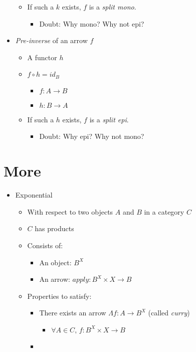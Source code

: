 \begin{itemize}
\begin{itemize}
\begin{itemize}
                \end{itemize}
          \item If such a $k$ exists, $f$ is a \emph{split mono}.
                \begin{itemize}
                  \item Doubt: Why mono? Why not epi?
                \end{itemize}
        \end{itemize}
  \item \emph{Pre-inverse} of an arrow $f$
        \begin{itemize}
          \item A functor $h$
          \item $f \circ h = id_B$
                \begin{itemize}
                  \item $f : A \to B$
                  \item $h : B \to A$
                \end{itemize}
          \item If such a $h$ exists, $f$ is a \emph{split epi}.
                \begin{itemize}
                  \item Doubt: Why epi? Why not mono?
                \end{itemize}
        \end{itemize}
\end{itemize}

\section{More}
\begin{itemize}
\item Exponential
  \begin{itemize}
  \item With respect to two objects $A$ and $B$ in a category $C$
  \item $C$ has products
  \item Consists of:
    \begin{itemize}
    \item An object: $B^X$
    \item An arrow: $apply: B^X \times X \to B$
    \end{itemize}
  \item Properties to satisfy:
    \begin{itemize}
    \item There exists an arrow $\Lambda f: A \to B^X$ (called \emph{curry})
      \begin{itemize}
        \item $\forall A \in C$, $f : B^X \times X \to B$
      \end{itemize}
    \item 
    \end{itemize}
  \end{itemize}
\end{itemize}